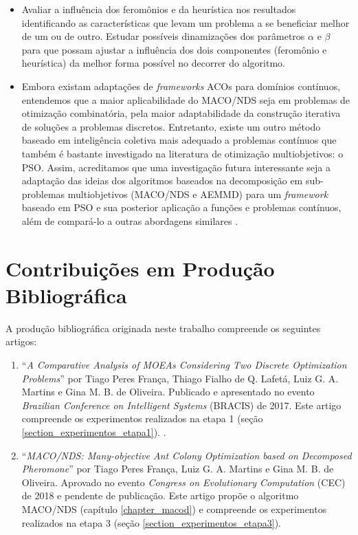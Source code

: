 \begin{itemize}
	\item Avaliar a influência dos feromônios e da heurística nos resultados identificando as características que levam um problema a se beneficiar melhor de um ou de outro. Estudar possíveis dinamizações dos parâmetros $\alpha$ e $\beta$ para que possam ajustar a influência dos dois componentes (feromônio e heurística) da melhor forma possível no decorrer do algoritmo.
	
	\item Embora existam adaptações de \textit{frameworks} ACOs para domínios contínuos, entendemos que a maior aplicabilidade do MACO/NDS seja em problemas de otimização combinatória, pela maior adaptabilidade da construção iterativa de soluções a problemas discretos. Entretanto, existe um outro método baseado em inteligência coletiva mais adequado a problemas contínuos que também é bastante investigado na literatura de otimização multiobjetivos: o PSO. Assim, acreditamos que uma investigação futura interessante seja a adaptação das ideias dos algoritmos baseados na decomposição em sub-problemas multiobjetivos (MACO/NDS e AEMMD) para um \textit{framework} baseado em PSO e sua posterior aplicação a funções e problemas contínuos, além de compará-lo a outras abordagens similares \cite{Freire2017}.
\end{itemize}

\section{Contribuições em Produção Bibliográfica}
A produção bibliográfica originada neste trabalho compreende os seguintes artigos:

\begin{enumerate}
	\item ``\textit{A Comparative Analysis of MOEAs Considering Two Discrete Optimization Problems}'' por Tiago Peres França, Thiago Fialho de Q. Lafetá, Luiz G. A. Martins e Gina M. B. de Oliveira. Publicado e apresentado no evento \textit{Brazilian Conference on Intelligent Systems} (BRACIS) de 2017. Este artigo compreende os experimentos realizados na etapa 1 (seção \ref{section_experimentos_etapa1}). \cite{Franca2017}.
	\item ``\textit{MACO/NDS: Many-objective Ant Colony Optimization based on Decomposed
		Pheromone}'' por Tiago Peres França, Luiz G. A. Martins e Gina M. B. de Oliveira. Aprovado no evento \textit{Congress on Evolutionary Computation} (CEC) de 2018 e pendente de publicação. Este artigo propõe o algoritmo MACO/NDS (capítulo \ref{chapter_macod}) e compreende os experimentos realizados na etapa 3 (seção \ref{section_experimentos_etapa3}).
\end{enumerate}